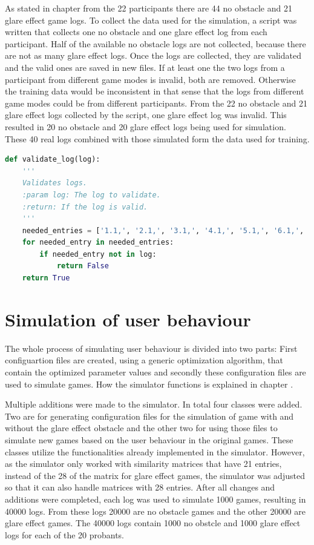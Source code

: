 As stated in chapter  from the 22 participants there are 44 no obstacle and 21 glare effect game logs. To collect the data used for the simulation, a script was written that collects one no obstacle and one glare effect log from each participant. Half of the available no obstacle logs are not collected, because there are not as many glare effect logs. Once the logs are collected, they are validated and the valid ones are saved in new files. If at least one the two logs from a participant from different game modes is invalid, both are removed. Otherwise the training data would be inconsistent in that sense that the logs from different game modes could be from different participants. From the 22 no obstacle and 21 glare effect logs collected by the script, one glare effect log was invalid. This resulted in 20 no obstacle and 20 glare effect logs being used for simulation. These 40 real logs combined with those simulated form the data used for training. 
\begin{lstlisting}[language=python, caption=Add caption, xleftmargin=5.0ex]
def validate_log(log):
	'''
	Validates logs.
	:param log: The log to validate. 
	:return: If the log is valid.
	'''
	needed_entries = ['1.1,', '2.1,', '3.1,', '4.1,', '5.1,', '6.1,', '7.1,', '1.2,', '2.2,', '3.2,', '4.2,', '5.2,', '6.2,', '7.2,']
	for needed_entry in needed_entries:
		if needed_entry not in log:
			return False
	return True
\end{lstlisting}

\section{Simulation of user behaviour}
\label{simulatoin_of_user_behaviour}
The whole process of simulating user behaviour is divided into two parts: First configuartion files are created, using a generic optimization algorithm, that contain the optimized parameter values and secondly these configuration files are used to simulate games. How the simulator functions is explained in chapter .

Multiple additions were made to the simulator. In total four classes were added. Two are for generating configuration files for the simulation of game with and without the glare effect obstacle %
and the other two for using those files to simulate new games based on the user behaviour in the original games.  %
These classes utilize the functionalities already implemented in the simulator. However, as the simulator only worked with similarity matrices that have 21 entries, instead of the 28 of the matrix for glare effect games, the simulator was adjusted so that it can also handle matrices with 28 entries. After all changes and additions were completed, each log was used to simulate 1000 games, resulting in 40000 logs. From these logs 20000 are no obstacle games and the other 20000 are glare effect games. The 40000 logs contain 1000 no obstcle and 1000 glare effect logs for each of the 20 probants.  

